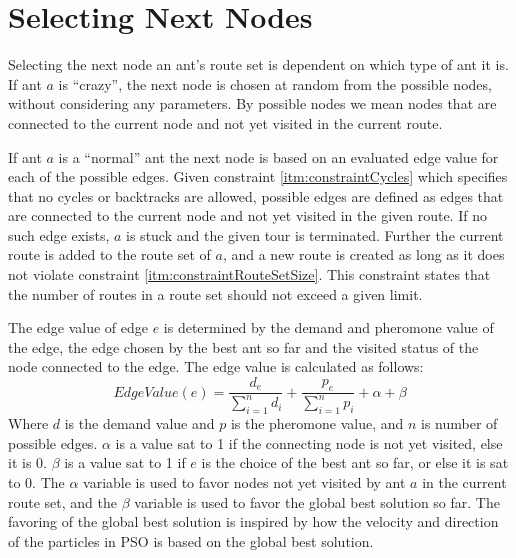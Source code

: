 \section{Selecting Next Nodes}

Selecting the next node an ant's route set is dependent on which type of ant it is. If ant $a$ is ``crazy'', the next node is chosen at random from the possible nodes, without considering any parameters. By possible nodes we mean nodes that are connected to the current node and not yet visited in the current route.

If ant $a$ is a ``normal'' ant the next node is based on an evaluated edge value for each of the possible edges. Given constraint \vref{itm:constraintCycles} which specifies that no cycles or backtracks are allowed, possible edges are defined as edges that are connected to the current node and not yet visited in the given route. If no such edge exists, $a$ is stuck and the given tour is terminated. Further the current route is added to the route set of $a$, and a new route is created as long as it does not violate constraint \vref{itm:constraintRouteSetSize}. This constraint states that the number of routes in a route set should not exceed a given limit. 

The edge value of edge $e$ is determined by the demand and pheromone value of the edge, the edge chosen by the best ant so far and the visited status of the node connected to the edge. The edge value is calculated as follows: 
\newline
$$EdgeValue(e) = \frac{d_e}{\sum\limits^{n}_{i=1}d_i} + \frac{p_e}{\sum\limits^{n}_{i=1}p_i} + \alpha + \beta$$
\newline
Where $d$ is the demand value and $p$ is the pheromone value, and $n$ is number of possible edges. $\alpha$ is a value sat to 1 if the connecting node is not yet visited, else it is 0. $\beta$ is a value sat to 1 if $e$ is the choice of the best ant so far, or else it is sat to 0. The $\alpha$ variable is used to favor nodes not yet visited by ant $a$ in the current route set, and the $\beta$ variable is used to favor the global best solution so far. The favoring of the global best solution is inspired by how the velocity and direction of the particles in PSO is based on the global best solution. 

